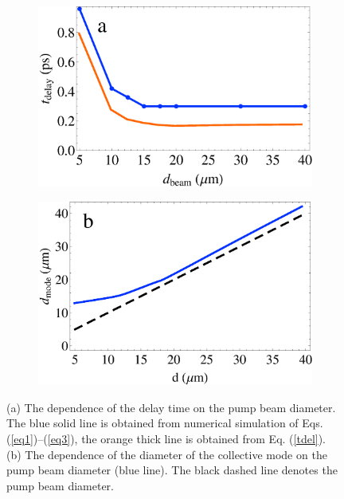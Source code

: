 \documentclass[aps,prapplied,amsmath,amssymb,onecolumn,superscriptaddress,showpacs,floatfix,longbibliography]{revtex4-1}
\begin{document}
\begin{figure}[h]
	\centering
	\begin{subfigure}[h]{0.45\linewidth}
		\includegraphics[width=\linewidth]{Fig5a.eps}
	\end{subfigure}
	\begin{subfigure}[h]{0.45\linewidth}
		\includegraphics[width=\linewidth]{Fig5b.eps}
	\end{subfigure}
	\caption{(a) The dependence of the delay time on the pump beam diameter. The blue solid line is obtained from numerical simulation of Eqs. (\ref{eq1})--(\ref{eq3}), the orange thick line is obtained from Eq. (\ref{tdel}). (b) The dependence of the diameter of the collective mode on the pump beam diameter (blue line). The black dashed line denotes the pump beam diameter.
	}
	\label{fig5}
\end{figure}
\end{document}
